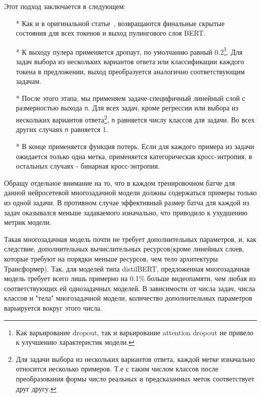 Этот подход заключается в следующем:
\begin{itemize}

    \item[*] Как и в оригинальной статье~\cite{bert}, возвращаются финальные скрытые состояния для всех токенов и выход пулингового слоя BERT. 

    \item[*] К выходу пулера применяется дропаут, по умолчанию равный 0.2\footnote{Как варьирование dropout, так и варьирование attention dropout не привело к улучшению характеристик модели.}. Для задач выбора из нескольких вариантов ответа или классификации каждого токена в предложении, выход преобразуется аналогично соответствующим задачам. 

    \item[*]После этого этапа, мы применяем задаче-специфичный линейный слой с размерностью выхода \texttt{n}. Для всех задач, кроме регрессии или выбора из нескольких вариантов ответа\footnote{Для задачи выбора из нескольких вариантов ответа, каждой метке изначально относится несколько примеров. Т.е с таким числом классов после преобразования формы число реальных и предсказанных меток соответствует друг другу.}, \texttt{n} равняется числу классов для задачи. Во всех других случаях \texttt{n} равняется 1.
 
    \item[*]В конце применяется функция потерь. Если для каждого примера из задачи ожидается только одна метка, применяется категорическая кросс-энтропия, в остальных случаях - бинарная кросс-энтропия. 

\end{itemize}

Обращу отдельное внимание на то, что в каждом тренировочном батче для данной нейросетевой многозадачной модели должны содержаться примеры только из одной задачи. В противном случае эффективный размер батча для каждой из задач оказывался меньше задаваемого изначально, что приводило к ухудшению метрик модели. 

Такая многозадачная модель почти не требует дополнительных параметров, и, как следствие, дополнительных вычислительных ресурсов(кроме линейных слоев, которые требуют на порядки меньше ресурсов, чем тело архитектуры Трансформер). Так, для моделей типа distilBERT, предложенная многозадачная модель требует всего лишь примерно на  0.1\% больше видеопамяти, чем любая из соответствующих ей однозадачных моделей. В зависимости от числа задач, числа классов и "тела" многозадачной модели, количество дополнительных параметров варьируется вокруг этого числа. 

